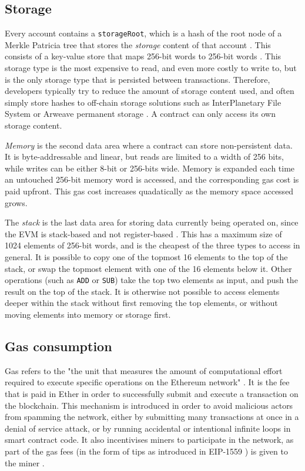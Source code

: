 \subsection{Storage}
\label{section:storage}
Every account contains a \texttt{storageRoot}, which is a hash of the root node of a Merkle
Patricia tree that stores the \textit{storage} content of that account \cite{ethereumyellowpaper}.
This consists of a key-value store that maps 256-bit words to 256-bit words \cite{solidityevm}.
This storage type is the most expensive to read, and even more costly to write to, but is the
only storage type that is persisted between transactions. Therefore, developers typically try 
to reduce the amount of storage content used, and often simply store hashes to off-chain storage
solutions such as InterPlanetary File System \cite{ipfs} or Arweave permanent storage \cite{arweave}. A contract
can only access its own storage content.

\textit{Memory} is the second data area where a contract can store non-persistent data. It is
byte-addressable and linear, but reads are limited to a width of 256 bits, while writes
can be either 8-bit or 256-bits wide. \cite{solidityevm} Memory is expanded each time an untouched 256-bit
memory word is accessed, and the corresponding gas cost is paid upfront. This gas cost increases
quadatically as the memory space accessed grows.

The \textit{stack} is the last data area for storing data currently being operated on, since
the EVM is stack-based and not register-based \cite{solidityevm}. This has a maximum
size of 1024 elements of 256-bit words, and is the cheapest of the three types to access in general. 
It is possible to copy one of the topmost 16 elements
to the top of the stack, or swap the topmost element with one of the 16 elements below it.
Other operations (such as \texttt{ADD} or \texttt{SUB}) take the top two elements as input,
and push the result on the top of the stack. It is otherwise not possible to access elements
deeper within the stack without first removing the top elements, or without moving elements
into memory or storage first.

\subsection{Gas consumption}
Gas refers to the "the unit that measures the amount of computational effort required 
to execute specific operations on the Ethereum network" \cite{ethgas}. It is the fee
that is paid in Ether in order to successfully submit and execute a transaction 
on the blockchain. This mechanism is introduced in order to avoid malicious actors
from spamming the network, either by submitting many transactions at once in a denial
of service attack, or by running accidental or intentional infinite loops in smart
contract code. It also incentivises miners to participate in the network, as part of
the gas fees (in the form of tips as introduced in EIP-1559 \cite{eip1559}) is given to the miner .

